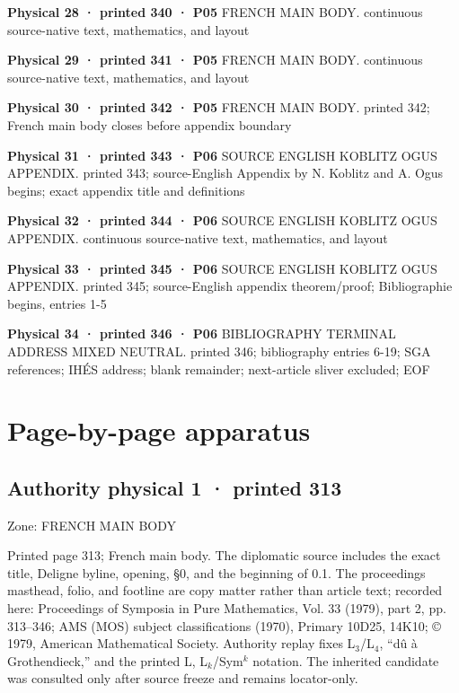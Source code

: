 \documentclass[10pt,twoside]{article}
\begin{document}
\noindent\textbf{Physical 28 · printed 340 · P05} \textsf{FRENCH MAIN BODY}. continuous source-native text, mathematics, and layout\par\smallskip
\noindent\textbf{Physical 29 · printed 341 · P05} \textsf{FRENCH MAIN BODY}. continuous source-native text, mathematics, and layout\par\smallskip
\noindent\textbf{Physical 30 · printed 342 · P05} \textsf{FRENCH MAIN BODY}. printed 342; French main body closes before appendix boundary\par\smallskip
\noindent\textbf{Physical 31 · printed 343 · P06} \textsf{SOURCE ENGLISH KOBLITZ OGUS APPENDIX}. printed 343; source-English Appendix by N. Koblitz and A. Ogus begins; exact appendix title and definitions\par\smallskip
\noindent\textbf{Physical 32 · printed 344 · P06} \textsf{SOURCE ENGLISH KOBLITZ OGUS APPENDIX}. continuous source-native text, mathematics, and layout\par\smallskip
\noindent\textbf{Physical 33 · printed 345 · P06} \textsf{SOURCE ENGLISH KOBLITZ OGUS APPENDIX}. printed 345; source-English appendix theorem/proof; Bibliographie begins, entries 1-5\par\smallskip
\noindent\textbf{Physical 34 · printed 346 · P06} \textsf{BIBLIOGRAPHY TERMINAL ADDRESS MIXED NEUTRAL}. printed 346; bibliography entries 6-19; SGA references; IHÉS address; blank remainder; next-article sliver excluded; EOF\par\smallskip
\normalsize
\clearpage
\section*{Page-by-page apparatus}
\subsection*{Authority physical 1 · printed 313}
\noindent\textsf{Zone: FRENCH MAIN BODY}\par
Printed page 313; French main body. The diplomatic source includes the exact title, Deligne byline, opening, \S{}0, and the beginning of 0.1. The proceedings masthead, folio, and footline are copy matter rather than article text; recorded here: Proceedings of Symposia in Pure Mathematics, Vol. 33 (1979), part 2, pp. 313–346; AMS (MOS) subject classifications (1970), Primary 10D25, 14K10; \copyright{} 1979, American Mathematical Society. Authority replay fixes L\ensuremath{_{3}}/L\ensuremath{_{4}}, “dû à Grothendieck,” and the printed L, L\ensuremath{_{k}}/Sym\ensuremath{^{k}} notation. The inherited candidate was consulted only after source freeze and remains locator-only.\par
\end{document}
